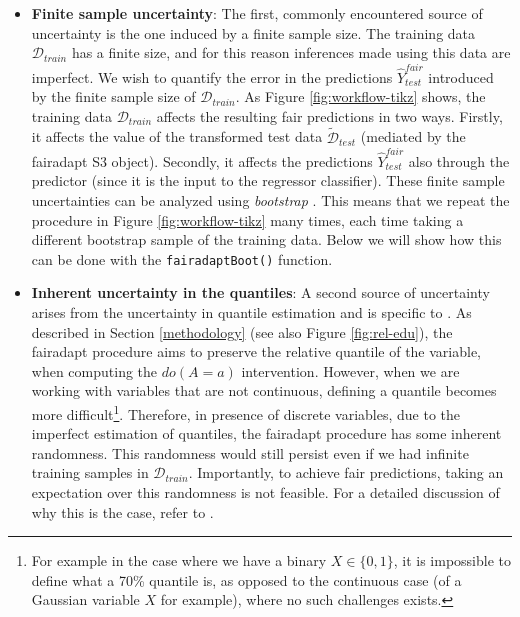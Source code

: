 \documentclass[
  nojss]{jss}
\begin{document}
\begin{itemize}
\item
  \textbf{Finite sample uncertainty}: The first, commonly encountered
  source of uncertainty is the one induced by a finite sample size. The
  training data \(\mathcal{D}_{train}\) has a finite size, and for this
  reason inferences made using this data are imperfect. We wish to
  quantify the error in the predictions \(\widehat{Y}^{fair}_{test}\)
  introduced by the finite sample size of \(\mathcal{D}_{train}\). As
  Figure \ref{fig:workflow-tikz} shows, the training data
  \(\mathcal{D}_{train}\) affects the resulting fair predictions in two
  ways. Firstly, it affects the value of the transformed test data
  \(\widetilde{\mathcal{D}}_{test}\) (mediated by the fairadapt S3
  object). Secondly, it affects the predictions
  \(\widehat{Y}^{fair}_{test}\) also through the predictor (since it is
  the input to the regressor classifier). These finite sample
  uncertainties can be analyzed using \emph{bootstrap}
  \citep{efron1994introduction}. This means that we repeat the procedure
  in Figure \ref{fig:workflow-tikz} many times, each time taking a
  different bootstrap sample of the training data. Below we will show
  how this can be done with the \texttt{fairadaptBoot()} function.
\item
  \textbf{Inherent uncertainty in the quantiles}: A second source of
  uncertainty arises from the uncertainty in quantile estimation and is
  specific to . As described in Section \ref{methodology}
  (see also Figure \ref{fig:rel-edu}), the fairadapt procedure aims to
  preserve the relative quantile of the variable, when computing the
  \(do(A=a)\) intervention. However, when we are working with variables
  that are not continuous, defining a quantile becomes more
  difficult\footnote{For example in the case where we have a binary $X \in \lbrace 0, 1 \rbrace$, it is impossible to define what a 70\% quantile is, as opposed to the continuous case (of a Gaussian variable $X$ for example), where no such challenges exists.}.
  Therefore, in presence of discrete variables, due to the imperfect
  estimation of quantiles, the fairadapt procedure has some inherent
  randomness. This randomness would still persist even if we had
  infinite training samples in \(\mathcal{D}_{train}\). Importantly, to
  achieve fair predictions, taking an expectation over this randomness
  is not feasible. For a detailed discussion of why this is the case,
  refer to \citep[Section~5]{plecko2020fair}.
\end{itemize}
\end{document}
